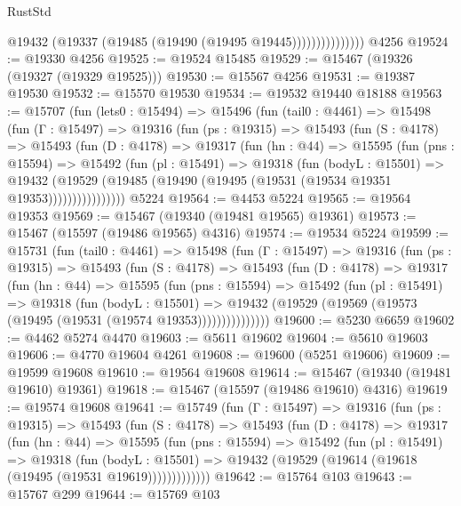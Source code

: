 \begin{lexlean}{RustStd}
\begin{coremodule}
                        @19432 (@19337 (@19485 (@19490 (@19495 @19445)))))))))))))))
    @4256
@19524 := @19330 @4256
@19525 := @19524 @15485
@19529 := @15467 (@19326 (@19327 (@19329 @19525)))
@19530 := @15567 @4256
@19531 := @19387 @19530
@19532 := @15570 @19530
@19534 := @19532 @19440 @18188
@19563 := @15707
    (fun (lets0 : @15494) =>
    @15496
      (fun (tail0 : @4461) =>
      @15498
        (fun (Γ : @15497) =>
        @19316
          (fun (ps : @19315) =>
          @15493
            (fun (S : @4178) =>
            @15493
              (fun (D : @4178) =>
              @19317
                (fun (hn : @44) =>
                @15595
                  (fun (pns : @15594) =>
                  @15492
                    (fun (pl : @15491) =>
                    @19318
                      (fun (bodyL : @15501) =>
                      @19432
                        (@19529
                          (@19485 (@19490 (@19495 (@19531 (@19534 @19351 @19353))))))))))))))))
    @5224
@19564 := @4453 @5224
@19565 := @19564 @19353
@19569 := @15467 (@19340 (@19481 @19565) @19361)
@19573 := @15467 (@15597 (@19486 @19565) @4316)
@19574 := @19534 @5224
@19599 := @15731
    (fun (tail0 : @4461) =>
    @15498
      (fun (Γ : @15497) =>
      @19316
        (fun (ps : @19315) =>
        @15493
          (fun (S : @4178) =>
          @15493
            (fun (D : @4178) =>
            @19317
              (fun (hn : @44) =>
              @15595
                (fun (pns : @15594) =>
                @15492
                  (fun (pl : @15491) =>
                  @19318
                    (fun (bodyL : @15501) =>
                    @19432 (@19529 (@19569 (@19573 (@19495 (@19531 (@19574 @19353)))))))))))))))
@19600 := @5230 @6659
@19602 := @4462 @5274 @4470
@19603 := @5611 @19602
@19604 := @5610 @19603
@19606 := @4770 @19604 @4261
@19608 := @19600 (@5251 @19606)
@19609 := @19599 @19608
@19610 := @19564 @19608
@19614 := @15467 (@19340 (@19481 @19610) @19361)
@19618 := @15467 (@15597 (@19486 @19610) @4316)
@19619 := @19574 @19608
@19641 := @15749
    (fun (Γ : @15497) =>
    @19316
      (fun (ps : @19315) =>
      @15493
        (fun (S : @4178) =>
        @15493
          (fun (D : @4178) =>
          @19317
            (fun (hn : @44) =>
            @15595
              (fun (pns : @15594) =>
              @15492
                (fun (pl : @15491) =>
                @19318
                  (fun (bodyL : @15501) =>
                  @19432 (@19529 (@19614 (@19618 (@19495 (@19531 @19619)))))))))))))
@19642 := @15764 @103
@19643 := @15767 @299
@19644 := @15769 @103

\end{coremodule}
\end{lexlean}
